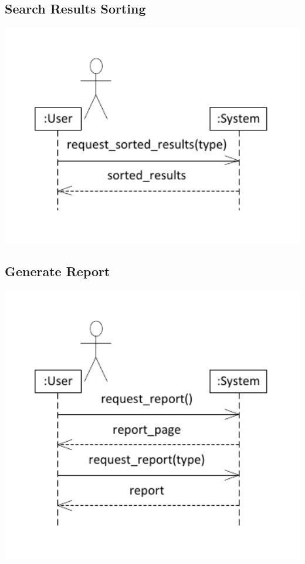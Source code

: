 \documentclass{article}
\begin{document}
\subsection{Search Results Sorting}
\includegraphics[keepaspectratio, width=6in]{ssd_search_result_sorting.pdf}\\
\subsection{Generate Report}
\includegraphics[keepaspectratio, width=6in]{ssd_generate_report.pdf}\\
\end{document}
